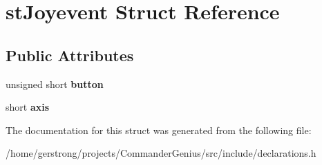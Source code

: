 \hypertarget{structst_joyevent}{
\section{stJoyevent Struct Reference}
\label{structst_joyevent}
}
\subsection*{Public Attributes}
\begin{DoxyCompactItemize}
\item 
\hypertarget{structst_joyevent_a725bd3878d87dd526a856bf6ea0574c9}{
unsigned short {\bfseries button}}
\label{structst_joyevent_a725bd3878d87dd526a856bf6ea0574c9}

\item 
\hypertarget{structst_joyevent_a6fa0c3556b9a72b0ecacd7ca3b245346}{
short {\bfseries axis}}
\label{structst_joyevent_a6fa0c3556b9a72b0ecacd7ca3b245346}

\end{DoxyCompactItemize}


The documentation for this struct was generated from the following file:\begin{DoxyCompactItemize}
\item 
/home/gerstrong/projects/CommanderGenius/src/include/declarations.h\end{DoxyCompactItemize}
